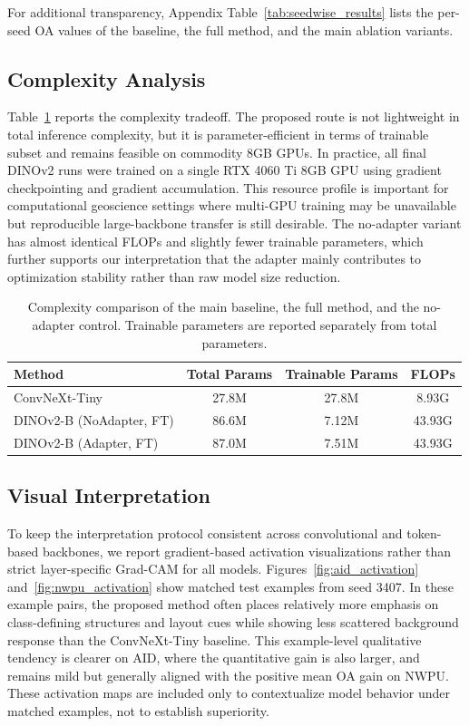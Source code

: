 \documentclass[a4paper,fleqn]{cas-sc}
\begin{document}
For additional transparency, Appendix Table~\ref{tab:seedwise_results} lists the per-seed OA values of the baseline, the full method, and the main ablation variants.

\subsection{Complexity Analysis}

Table~\ref{tab:complexity_results} reports the complexity tradeoff. The proposed route is not lightweight in total inference complexity, but it is parameter-efficient in terms of trainable subset and remains feasible on commodity 8GB GPUs. In practice, all final DINOv2 runs were trained on a single RTX 4060 Ti 8GB GPU using gradient checkpointing and gradient accumulation. This resource profile is important for computational geoscience settings where multi-GPU training may be unavailable but reproducible large-backbone transfer is still desirable. The no-adapter variant has almost identical FLOPs and slightly fewer trainable parameters, which further supports our interpretation that the adapter mainly contributes to optimization stability rather than raw model size reduction.

\begin{table}
  \centering
  \caption{Complexity comparison of the main baseline, the full method, and the no-adapter control. Trainable parameters are reported separately from total parameters.}
  \label{tab:complexity_results}
  \begin{tabular}{l c c c}
    \toprule
    Method & Total Params & Trainable Params & FLOPs \\
    \midrule
    ConvNeXt-Tiny & 27.8M & 27.8M & 8.93G \\
    DINOv2-B (NoAdapter, FT) & 86.6M & 7.12M & 43.93G \\
    DINOv2-B (Adapter, FT) & 87.0M & 7.51M & 43.93G \\
    \bottomrule
  \end{tabular}
\end{table}


\subsection{Visual Interpretation}

To keep the interpretation protocol consistent across convolutional and token-based backbones, we report gradient-based activation visualizations rather than strict layer-specific Grad-CAM for all models. Figures~\ref{fig:aid_activation} and~\ref{fig:nwpu_activation} show matched test examples from seed 3407. In these example pairs, the proposed method often places relatively more emphasis on class-defining structures and layout cues while showing less scattered background response than the ConvNeXt-Tiny baseline. This example-level qualitative tendency is clearer on AID, where the quantitative gain is also larger, and remains mild but generally aligned with the positive mean OA gain on NWPU. These activation maps are included only to contextualize model behavior under matched examples, not to establish superiority.
\end{document}
